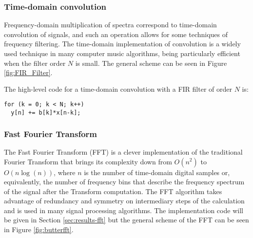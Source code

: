 \subsubsection{Time-domain convolution}

Frequency-domain multiplication of spectra correspond to time-domain
convolution of signals, and such an operation allows for some techniques of frequency filtering.
The time-domain implementation of convolution is a widely used technique in
many computer music algorithms, being particularly efficient when the filter order $N$ is small. The general scheme can be seen in Figure
\ref{fig:FIR_Filter}.


The high-level code for a time-domain convolution with a FIR filter of order $N$ is:

\begin{lstlisting}
for (k = 0; k < N; k++)
  y[n] += b[k]*x[n-k];
\end{lstlisting}

\subsubsection{Fast Fourier Transform}

The Fast Fourier Transform (FFT) is a clever implementation of the traditional
Fourier Transform that brings its complexity down from $O(n^2)$ to
$O(n\log(n))$, where $n$ is the number of time-domain digital samples or,
equivalently, the number of frequency bins that describe the frequency
spectrum of the signal after the Transform computation. The FFT algorithm
takes advantage of redundancy and symmetry on intermediary steps of the
calculation and is used in many signal processing algorithms. The implementation
code will be given in Section \ref{sec:results-fft} but the general scheme of the FFT can
be seen in Figure \ref{fig:butterfft}.




